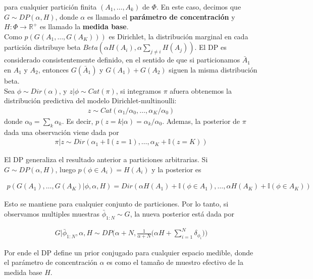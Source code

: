 \documentclass[letterpaper,12pt,oneside]{book} %
\begin{document}
para cualquier partición finita $(A_{1}, \ldots, A_{k})$ de $\Phi$. En este caso, decimos que $G\sim DP(\alpha, H)$, donde $\alpha$ es llamado el \textbf{parámetro de concentración} y $H: \Phi \rightarrow \mathbb{R}^{+}$ es llamado la \textbf{medida base}.\\

Como $p(G(A_{1}, \ldots, G(A_{K})))$ es Dirichlet, la distribución marginal en cada partición distribuye beta $Beta(\alpha H(A_{i}), \alpha \sum_{j\neq i}H(A_{j}))$. El DP es considerado consistentemente definido, en el sentido de que si particionamos $\bar{A}_{1}$ en $A_{1}$ y $A_{2}$, entonces $G(\bar{A}_{1})$ y $G(A_{1})+G(A_{2})$ siguen la misma distribución beta. \\

Sea $\phi \sim Dir(\alpha)$, y $z|\phi  \sim Cat(\pi)$, si integramos $\pi$ afuera obtenemos la distribución predictiva del modelo Dirichlet-multinoulli:
\begin{align}
    z\sim Cat(\alpha_{1}/\alpha_{0}, \ldots, \alpha_{K}/\alpha_{0})
\end{align}
donde $\alpha_{0} = \sum_{k}\alpha_{k}$. Es decir, $p(z=k|\alpha)=\alpha_{k}/\alpha_{0}$. Ademas, la posterior de $\pi$ dada una observación viene dada por
\begin{align}
    \pi|z \sim Dir(\alpha_{1}+\mathbb{I}(z=1), \ldots, \alpha_{K}+\mathbb{I}(z=K))
\end{align}

El DP generaliza el resultado anterior a particiones arbitrarias. Si $G\sim DP(\alpha, H)$, luego $p(\phi \in A_{i})=H(A_{i})$ y la posterior es

\begin{align}
    p(G(A_{1}), \ldots, G(A_{K})|\phi, \alpha, H) = Dir(\alpha H(A_{1})+\mathbb{I}(\phi \in A_{1}), \ldots, \alpha H(A_{K})+\mathbb{I}(\phi \in A_{K}))
\end{align}

Esto se mantiene para cualquier conjunto de particiones. Por lo tanto, si observamos multiples muestras $\bar{\phi}_{1:N}\sim G$, la nueva posterior está dada por 

\begin{align}
G|\bar{\phi}_{1:N}, \alpha, H \sim DP\bigg(\alpha+N, \frac{1}{\alpha+N}\bigg(\alpha H+\sum_{i=1}^{N}\delta_{\phi_{i}}\bigg)\bigg)
\end{align}

Por ende el DP define un prior conjugado para cualquier espacio medible, donde el parámetro de concentración $\alpha$ es como el tamaño de muestro efectivo de la medida base $H$.\\
\end{document}
